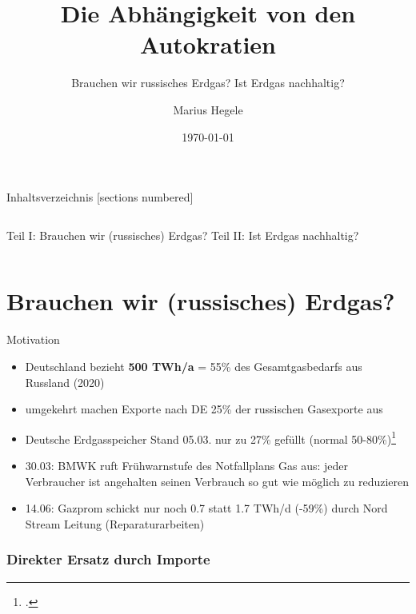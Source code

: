 \documentclass[10pt]{beamer}
\title{Die Abhängigkeit von den Autokratien}
\subtitle{Brauchen wir russisches Erdgas? Ist Erdgas nachhaltig?}
\date{\today}
\author{Marius Hegele}
\institute{Technik und Fortschritt im Anthropozän, SoSe 2022, ZAK/KIT}
\begin{document}
\maketitle

\begin{frame}{Inhaltsverzeichnis}
  [sections numbered]
  \begin{columns}
  Teil I: Brauchen wir (russisches) Erdgas?
  \tableofcontents[hideallsubsections,part=1]
  Teil II: Ist Erdgas nachhaltig?
  \tableofcontents[hideallsubsections,part=2]
  \end{columns}
\end{frame}

\part{Brauchen wir (russisches) Erdgas?}
\frame{\partpage}

\begin{frame}{Motivation}

  \addtolength{\leftmargini}{\labelsep}

  \small{
  \begin{itemize}
    \item Deutschland bezieht \textbf{500 TWh/a} = 55\% des Gesamtgasbedarfs aus Russland (2020)
    \item umgekehrt machen Exporte nach DE 25\% der russischen Gasexporte aus
    \item Deutsche Erdgasspeicher Stand 05.03. nur zu 27\% gefüllt (normal 50-80\%)\footcite{leo}
    \item 30.03: BMWK ruft Frühwarnstufe des Notfallplans Gas aus:
      jeder Verbraucher ist angehalten seinen Verbrauch so gut wie möglich zu reduzieren
    \item 14.06: Gazprom schickt nur noch 0.7 statt 1.7 TWh/d (-59\%) durch Nord Stream Leitung (Reparaturarbeiten)
  \end{itemize}
  }
\end{frame}


\section{Direkter Ersatz durch Importe}
\end{document}
